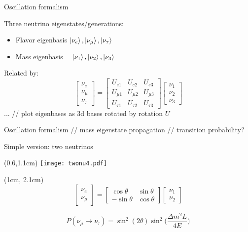 \documentclass{beamer}
\begin{document}
\begin{frame}{Oscillation formalism}

	Three neutrino eigenstates/generations:\\
	\begin{itemize}
		\item Flavor eigenbasis $\ket{\nu_e}, \ket{\nu_\mu}, \ket{\nu_\tau}$\\
		\item Mass eigenbasis ~~$\ket{\nu_1}, \ket{\nu_2}, \ket{\nu_3}$
	\end{itemize}

	Related by:
	$$
	\begin{bmatrix} \nu_e \\ \nu_\mu \\ \nu_\tau \end{bmatrix} =
	\begin{bmatrix} U_{e 1} & U_{e 2} & U_{e 3} \\ U_{\mu 1} & U_{\mu 2} & U_{\mu 3}
	\\ U_{\tau 1} & U_{\tau 2} & U_{\tau 3} \end{bmatrix}
	\begin{bmatrix} \nu_1 \\ \nu_2 \\ \nu_3 \end{bmatrix}
	$$
	...
	// plot eigenbases as 3d bases rotated by rotation $U$
\end{frame}

\begin{frame}{Oscillation formalism}
	// mass eigenstate propagation
	// transition probability?


\end{frame}

\begin{frame}{Simple version: two neutrinos}
	\begin{textblock*}{0.6\textwidth}(0.6\textwidth,1.1cm)
	\texttt{[image: twonu4.pdf]}
	\end{textblock*}
	
	\begin{textblock*}{0.4\textwidth}(1cm, 2.1cm)
		$$
	\begin{bmatrix} \nu_e \\ \nu_\mu \end{bmatrix} =
	\begin{bmatrix} \cos\theta & \sin\theta \\
								 -\sin\theta & \cos\theta \end{bmatrix}
		\begin{bmatrix} \nu_1 \\ \nu_2 \end{bmatrix}
	$$
	\end{textblock*}

	\vspace{2.5cm}
	$$
		P(\nu_\mu \rightarrow \nu_\tau) = \sin^2(2 \theta) \sin^2\bigg(\frac{\Delta
		m^2 L}{4 E}\bigg)
	$$
\end{frame}
\end{document}
